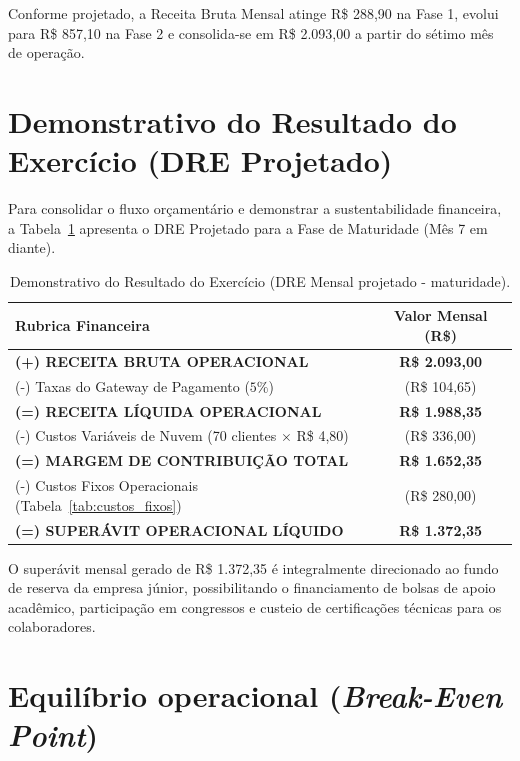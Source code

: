 \documentclass[
  12pt,
  openright,
  oneside,
  a4paper,
  brazilian
]{abntex2}
\begin{document}
Conforme projetado, a Receita Bruta Mensal atinge R\$ 288,90 na Fase 1, evolui para R\$ 857,10 na Fase 2 e consolida-se em R\$ 2.093,00 a partir do sétimo mês de operação.

\section{Demonstrativo do Resultado do Exercício (DRE Projetado)}
\label{sec:dre_projetado}

Para consolidar o fluxo orçamentário e demonstrar a sustentabilidade financeira, a Tabela~\ref{tab:dre_projetado} apresenta o DRE Projetado para a Fase de Maturidade (Mês 7 em diante).

\begin{table}[htbp]
\centering
\caption{Demonstrativo do Resultado do Exercício (DRE Mensal projetado - maturidade).}
\label{tab:dre_projetado}
\begin{tabular}{|l|c|}
\hline
\textbf{Rubrica Financeira} & \textbf{Valor Mensal (R\$)} \\ \hline
\textbf{(+) RECEITA BRUTA OPERACIONAL} & \textbf{R\$ 2.093,00} \\ \hline
(-) Taxas do Gateway de Pagamento ($5\%$) & (R\$ 104,65) \\ \hline
\textbf{(=) RECEITA LÍQUIDA OPERACIONAL} & \textbf{R\$ 1.988,35} \\ \hline
(-) Custos Variáveis de Nuvem (70 clientes $\times$ R\$ 4,80) & (R\$ 336,00) \\ \hline
\textbf{(=) MARGEM DE CONTRIBUIÇÃO TOTAL} & \textbf{R\$ 1.652,35} \\ \hline
(-) Custos Fixos Operacionais (Tabela~\ref{tab:custos_fixos}) & (R\$ 280,00) \\ \hline
\textbf{(=) SUPERÁVIT OPERACIONAL LÍQUIDO} & \textbf{R\$ 1.372,35} \\ \hline
\end{tabular}
\end{table}

O superávit mensal gerado de R\$ 1.372,35 é integralmente direcionado ao fundo de reserva da empresa júnior, possibilitando o financiamento de bolsas de apoio acadêmico, participação em congressos e custeio de certificações técnicas para os colaboradores.

\section{Equilíbrio operacional (\textit{Break-Even Point})}
\label{sec:ponto_equilibrio}
\end{document}
